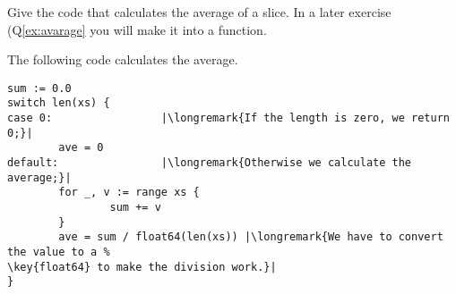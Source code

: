 \begin{Exercise}[title={Average},difficulty=4]
\label{ex:average no func}
\Question\label{ex:average no func q1} Give the code
that calculates the average of a  slice. In
a later exercise (Q\ref{ex:avarage} you will make it into
a function.
\end{Exercise}

\begin{Answer}
\Question The following code calculates the average.
\begin{lstlisting}
sum := 0.0 
switch len(xs) {
case 0:                 |\longremark{If the length is zero, we return 0;}|
        ave = 0
default:                |\longremark{Otherwise we calculate the average;}|
        for _, v := range xs {
                sum += v
        }
        ave = sum / float64(len(xs)) |\longremark{We have to convert the value to a %
\key{float64} to make the division work.}|
}
\end{lstlisting}
\showremarks
\end{Answer}
